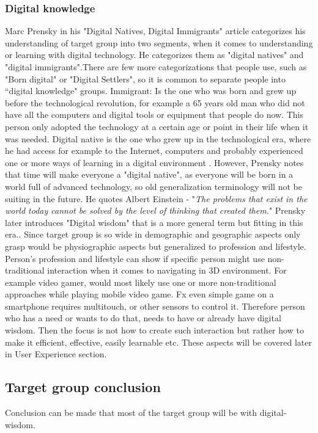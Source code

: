 \subsubsection{Digital knowledge}
Marc Prensky in his "Digital Natives, Digital Immigrants" \cite{DigitalImmigrants} article categorizes his understanding of target group into two segments, when it comes to understanding or learning with digital technology. He categorizes them as "digital natives" and "digital immigrants".There are few more categorizations that people use, such as "Born digital" or "Digital Settlers", so it is common to separate people into “digital knowledge" groups. Immigrant: Is the one who was born and grew up before the technological revolution, for example a 65 years old man who did not have all the computers and digital tools or equipment that people do now. This person only adopted the technology at a certain age or point in their life when it was needed. Digital native is the one who grew up in the technological era, where he had access for example to the Internet, computers and probably experienced one or more ways of learning in a digital environment \cite{DigitalImmigrants}. However, Prensky notes that time will make everyone a "digital native", as everyone will be born in a world full of advanced technology, so old generalization terminology will not be suiting in the future. He quotes Albert Einstein - "\textit{The problems that exist in the world today cannot be solved by the level of thinking that created them.}" Prensky later introduces "Digital wisdom" that is a more general term but fitting in this era.\cite{DigitaIWisdom}. Since target group is so wide in demographic and geographic aspects only grasp would be physiographic aspects but generalized to profession and lifestyle. Person's profession and lifestyle can show if specific person might use non-traditional interaction when it comes to navigating in 3D environment. For example video gamer, would most likely use one or more non-traditional approaches while playing mobile video game. Fx even simple game on a smartphone requires multitouch, or other sensors to control it. 
Therefore person who has a need or wants to do that, needs to have or already have digital wisdom. Then the focus is not how to create such interaction but rather how to make it efficient, effective, easily learnable etc. These aspects will be covered later in User Experience section.

\subsection{Target group conclusion}
Conclusion can be made that most of the target group will be with digital-wisdom.